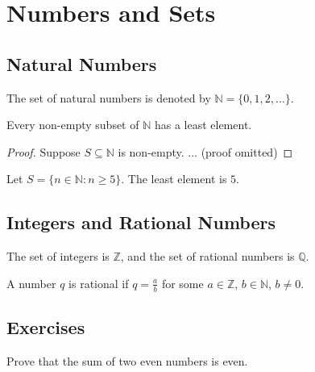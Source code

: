 \documentclass[
    11pt,
    fleqn,
    a4paper
]{mathbook}
\begin{document}

\chapter{Numbers and Sets}

\section{Natural Numbers}
The set of natural numbers is denoted by $\mathbb{N} = \{0, 1, 2, \ldots\}$.

\begin{theorem}
Every non-empty subset of $\mathbb{N}$ has a least element.
\end{theorem}

\begin{proof}
Suppose $S \subseteq \mathbb{N}$ is non-empty. ... (proof omitted)
\end{proof}

\begin{example}
Let $S = \{n \in \mathbb{N} : n \geq 5\}$. The least element is $5$.
\end{example}

\section{Integers and Rational Numbers}
The set of integers is $\mathbb{Z}$, and the set of rational numbers is $\mathbb{Q}$.

\begin{definition}
A number $q$ is rational if $q = \frac{a}{b}$ for some $a \in \mathbb{Z}$, $b \in \mathbb{N}$, $b \neq 0$.
\end{definition}

\section{Exercises}
\begin{exercise}
Prove that the sum of two even numbers is even.
\end{exercise}

\end{document}
